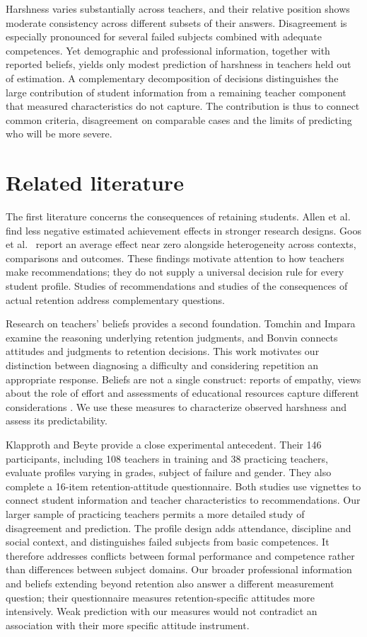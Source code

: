 Harshness varies substantially across teachers, and their relative position shows moderate consistency across different subsets of their answers. Disagreement is especially pronounced for several failed subjects combined with adequate competences. Yet demographic and professional information, together with reported beliefs, yields only modest prediction of harshness in teachers held out of estimation. A complementary decomposition of decisions distinguishes the large contribution of student information from a remaining teacher component that measured characteristics do not capture. The contribution is thus to connect common criteria, disagreement on comparable cases and the limits of predicting who will be more severe.

\section{Related literature}
The first literature concerns the consequences of retaining students. Allen et al.\ \cite{allen} find less negative estimated achievement effects in stronger research designs. Goos et al.\ \cite{goos} report an average effect near zero alongside heterogeneity across contexts, comparisons and outcomes. These findings motivate attention to how teachers make recommendations; they do not supply a universal decision rule for every student profile. Studies of recommendations and studies of the consequences of actual retention address complementary questions.

Research on teachers' beliefs provides a second foundation. Tomchin and Impara \cite{tomchin} examine the reasoning underlying retention judgments, and Bonvin \cite{bonvin} connects attitudes and judgments to retention decisions. This work motivates our distinction between diagnosing a difficulty and considering repetition an appropriate response. Beliefs are not a single construct: reports of empathy, views about the role of effort and assessments of educational resources capture different considerations \cite{pajares}. We use these measures to characterize observed harshness and assess its predictability.

Klapproth and Beyte \cite{klapproth} provide a close experimental antecedent. Their 146 participants, including 108 teachers in training and 38 practicing teachers, evaluate profiles varying in grades, subject of failure and gender. They also complete a 16-item retention-attitude questionnaire. Both studies use vignettes to connect student information and teacher characteristics to recommendations. Our larger sample of practicing teachers permits a more detailed study of disagreement and prediction. The profile design adds attendance, discipline and social context, and distinguishes failed subjects from basic competences. It therefore addresses conflicts between formal performance and competence rather than differences between subject domains. Our broader professional information and beliefs extending beyond retention also answer a different measurement question; their questionnaire measures retention-specific attitudes more intensively. Weak prediction with our measures would not contradict an association with their more specific attitude instrument.

